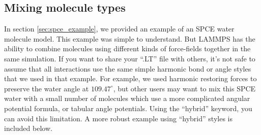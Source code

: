 \documentclass[11pt]{article}
\begin{document}
\subsection{Mixing molecule types}
In section \ref{sec:spce_example}, 
we provided an example of an SPCE water molecule model.
This example was simple to understand.
But LAMMPS has the ability to combine molecules using different
kinds of force-fields together in the same simulation.
If you want to share your ``.LT'' file with others, it's not safe to assume
that all interactions use the same simple harmonic bond or angle styles
that we used in that example.
For example, we used harmonic restoring forces to preserve the water angle 
at $109.47^\circ$, but other users may want to mix this SPCE water with a small 
number of molecules which use a more complicated angular potential formula,
or tabular angle potentials.
Using the ``hybrid'' keyword, you can avoid this limitation. 
A more robust example using ``hybrid'' styles is included below.
\end{document}
